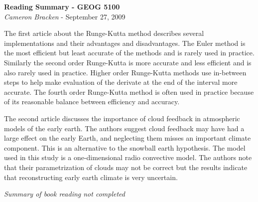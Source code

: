 \documentclass[11pt,oneside]{article}
\begin{document}
\begin{center}
	\textbf{Reading Summary - GEOG 5100}\\
	{\itshape Cameron Bracken} - September 27, 2009
\end{center}
\doublespacing

The first article about the Runge-Kutta method describes several implementations and their advantages and disadvantages. The Euler method is the most efficient but least accurate of the methods and is rarely used in practice.   Similarly the second order Runge-Kutta is more accurate and less efficient and is also rarely used in practice.  Higher order Runge-Kutta methods use in-between steps to help make evaluation of the derivate at the  end of the interval more accurate. The fourth order Runge-Kutta method is often used in practice because of its reasonable balance between efficiency and accuracy. 

The second article discusses the importance of cloud feedback in atmospheric models of the early earth.  The authors suggest cloud feedback may have had a large effect on the early Earth, and neglecting them misses an important climate component.  This is an alternative to the snowball earth hypothesis.  The model used in this study is a one-dimensional radio convective model. The authors note that their parametrization of clouds may not be correct but the results indicate that reconstructing early earth climate is very uncertain. 

{\it Summary of book reading not completed}
\end{document}
